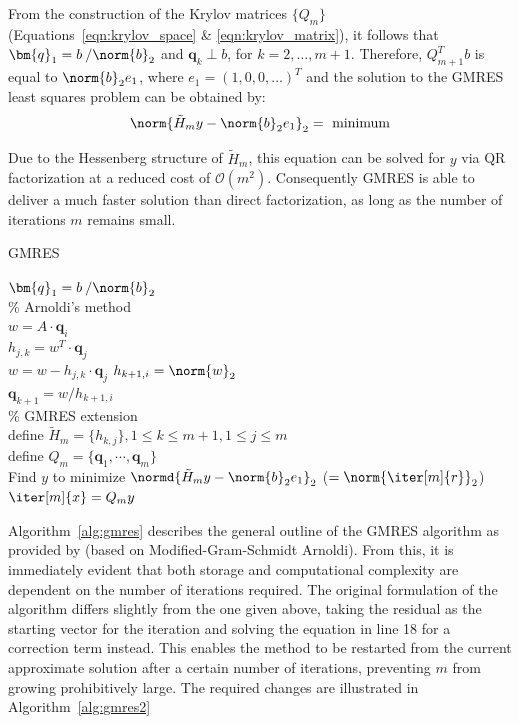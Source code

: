 \noindent From the construction of the Krylov matrices $\{Q_m\}$ (Equations~\hyperref[eqn:krylov_space]{\ref{eqn:krylov_space}} \& \hyperref[eqn:krylov_matrix]{\ref{eqn:krylov_matrix}}), it follows that $\bm{q}_1=b\:/\norm{b}_2$ and $\bm{q}_k \perp b$, for $k = 2, \dots, m+1$. Therefore, $Q^T_{m+1}b$ is equal to $\norm{b}_2e_1$, where $e_1=(1,0,0,\dots)^T$ and the solution to the GMRES least squares problem can be obtained by:
\begin{equation}
    \norm{\tilde{H}_my-\norm{b}_2e_1}_2 = \text{ minimum}
\end{equation}

\noindent Due to the Hessenberg structure of $\tilde{H}_m$, this equation can be solved for $y$ via QR factorization at a reduced cost of $\mathcal{O}(m^2)$. Consequently GMRES is able to deliver a much faster solution than direct factorization, as long as the number of iterations $m$ remains small.

\begin{algorithm}[h]
  \caption{GMRES}
  \label{alg:gmres}
  \SetAlgoLined
  \DontPrintSemicolon
  $\bm{q}_1= b\:/\norm{b}_2$ \\
  \% Arnoldi's method \\
   {
    $w =A\cdot \bm{q}_i$ \\
     {
      $h_{j,k} = w^T\cdot \bm{q}_j$ \\
      $ w = w - h_{j,k}\cdot \bm{q}_j$}
    $h_{k+1,i} = \norm{w}_2$ \\
    $\bm{q}_{k+1} = w/h_{k+1,i}$ \\
  }
  \;
  \% GMRES extension \\
  define $\tilde{H}_m = \{h_{k,j}\}, 1 \leq k \leq m+1, 1 \leq j \leq m$ \\
  define $Q_m = \{\bm{q}_1, \cdots, \bm{q}_m\}$ \\
  Find $y$ to minimize $\normd{\tilde{H}_my-\norm{b}_2e_1}_2$ ($=\norm{\iter[m]{r}}_2$) \\
  $\iter[m]{x} = Q_my$
\end{algorithm}

\noindent Algorithm~\hyperref[alg:gmres]{\ref{alg:gmres}} describes the general outline of the GMRES algorithm as provided by \cite{trefethen_numerical_1997} (based on Modified-Gram-Schmidt Arnoldi). From this, it is immediately evident that both storage and computational complexity are dependent on the number of iterations required. The original formulation of the algorithm \cite{saad_gmres_1986} differs slightly from the one given above, taking the residual as the starting vector for the iteration and solving the equation in line 18 for a correction term instead. This enables the method to be restarted from the current approximate solution after a certain number of iterations, preventing $m$ from growing prohibitively large. The required changes are illustrated in Algorithm~\hyperref[alg:gmres2]{\ref{alg:gmres2}}

